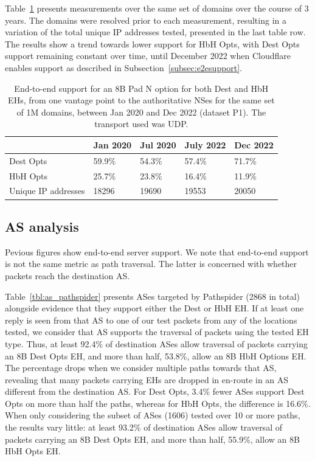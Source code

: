\documentclass[conference]{IEEEtran}
\begin{document}
Table~\ref{tbl:longitudinal_support} presents measurements over the same set of domains over the course of 3 years. The domains were resolved prior to each measurement, resulting in a variation of the total unique IP addresses tested, presented in the last table row. The results show a trend towards lower support for HbH Opts, with Dest Opts support remaining constant over time, until December 2022 when Cloudflare enables support as described in Subsection~\ref{subsec:e2esupport}.

\begin{table}[]
\begin{tabular}{l|l|l|l|l}
                    & Jan 2020 & Jul 2020 & July 2022 & Dec 2022 \\
\hline
Dest Opts & 59.9\%   & 54.3\%   & 57.4\%    & 71.7\%   \\
HbH Opts  & 25.7\%   & 23.8\%   & 16.4\%    & 11.9\%   \\
\hline
Unique IP addresses & 18296    & 19690    & 19553     & 20050   
\end{tabular}
\label{tbl:longitudinal_support}
\caption{End-to-end support for an 8B Pad N option for both Dest and HbH EHs, from one vantage point to the authoritative NSes for the same set of 1M domains, between Jan 2020 and Dec 2022 (dataset P1). The transport used was UDP.}
\end{table}

\subsection{AS analysis }

Pevious figures show end-to-end server support. We note that end-to-end support is not the same metric as path traversal. The latter is concerned with whether packets reach the destination AS.

Table~\ref{tbl:as_pathspider} presents ASes targeted by Pathspider (2868 in total) alongside evidence that they support either the Dest or HbH EH.
If at least one reply is seen from that AS to one of our test packets from any of the locations tested, we consider that AS supports the traversal of packets using the tested EH type. Thus, at least 92.4\% of destination ASes allow traversal of packets carrying an 8B Dest Opts EH, and more than half, 53.8\%, allow an 8B HbH Options EH. The percentage drops when we consider multiple paths towards that AS, revealing that many packets carrying EHs are dropped in en-route in an AS different from the destination AS. For Dest Opts, 3.4\% fewer ASes support Dest Opts on more than half the paths, whereas for HbH Opts, the difference is 16.6\%.
When only considering the subset of ASes (1606) tested over 10 or more paths, the results vary little: at least 93.2\% of destination ASes allow traversal of packets carrying an 8B Dest Opts EH, and more than half, 55.9\%, allow an 8B HbH Opts EH.
\end{document}
